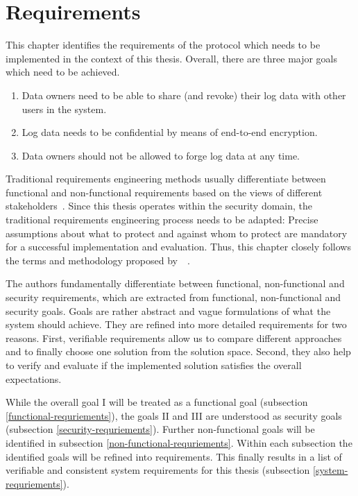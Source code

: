 \documentclass[../main.tex]{subfiles}
\begin{document}
\chapter{Requirements}
\label{chap:requirements}

This chapter identifies the requirements of the protocol which needs to be implemented in the context of this thesis.
Overall, there are three major goals which need to be achieved. 

\begin{enumerate}[label=\Roman*.]
    \item Data owners need to be able to share (and revoke) their log data with other users in the system.
	\item Log data needs to be confidential by means of end-to-end encryption.
    \item Data owners should not be allowed to forge log data at any time.
\end{enumerate}


Traditional requirements engineering methods usually differentiate between functional and non-functional requirements based on the views of different stakeholders~.
Since this thesis operates within the security domain, the traditional requirements engineering process needs to be adapted: 
Precise assumptions about what to protect and against whom to protect are mandatory for a successful implementation and evaluation.
Thus, this chapter closely follows the terms and methodology proposed by~\citeauthor{Fabian2010}~\cite{Fabian2010}.

The authors fundamentally differentiate between functional, non-functional and security requirements, which are extracted from functional, non-functional and security goals.
Goals are rather abstract and vague formulations of what the system should achieve. 
They are refined into more detailed requirements for two reasons.
First, verifiable requirements allow us to compare different approaches and to finally choose one solution from the solution space. 
Second, they also help to verify and evaluate if the implemented solution satisfies the overall expectations.~\cite{Fabian2010}

While the overall goal I will be treated as a functional goal (subsection \ref{functional-requriements}), the goals II and III are understood as security goals (subsection \ref{security-requriements}).
Further non-functional goals will be identified in subsection \ref{non-functional-requriements}.
Within each subsection the identified goals will be refined into requirements.
This finally results in a list of verifiable and consistent system requirements for this thesis (subsection \ref{system-requriements}).
\end{document}
